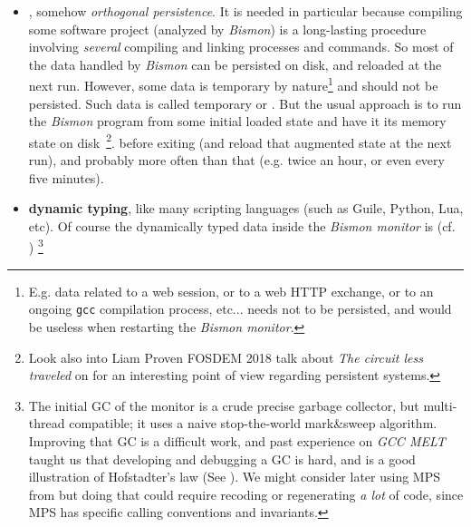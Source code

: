 \begin{itemize}

  \item {}, somehow
    \textit{orthogonal persistence}. It is needed in particular
    because compiling some software project (analyzed by
    \textit{Bismon}) is a long-lasting procedure involving
    \textit{several} compiling and linking processes and commands. So
    most of the data handled by \textit{Bismon} can be persisted on
    disk, and reloaded at the next run. However, some data is
    temporary by nature\footnote{E.g. data related to a web session,
      or to a web HTTP exchange, or to an ongoing \texttt{gcc}
      compilation process, etc... needs not to be persisted, and would
      be useless when restarting the \textit{Bismon monitor}.} and
    should not be persisted. Such data is called temporary or
    . But the usual approach is
    to run the \textit{Bismon} program from some initial loaded state
    and have it  its memory state on
    disk~\footnote{Look also into Liam Proven FOSDEM 2018 talk about
      \emph{The circuit less traveled} on
      for an interesting point of view regarding persistent systems.}.
    before exiting (and reload that augmented state at the next run),
    and probably more often than that (e.g. twice an hour, or even
    every five minutes).

  \item \textbf{dynamic typing}, like many scripting languages (such
    as Guile, Python, Lua, etc). Of course the dynamically typed data
    inside the \textit{Bismon monitor} is 
    (cf. \cite{Jones:2011:GC-handbook})
    \footnote{\label{fn:initial-gc}The initial GC of the monitor is a crude precise garbage
      collector, but multi-thread compatible; it uses a naive
      stop-the-world mark\&sweep algorithm. Improving that GC is a
      difficult work, and past experience on \emph{GCC MELT} taught us
      that developing and debugging a GC is hard, and is a good
      illustration of Hofstadter's law (See
      \cite{Hofstadter:1979:GEB}). We might consider later using MPS
      from  but doing
      that could require recoding or regenerating \emph{a lot} of code, since MPS has specific calling conventions and invariants.}


\end{itemize}
